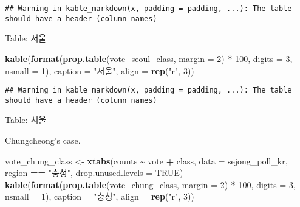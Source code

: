 \documentclass[
]{article}
\newenvironment{Shaded}{\begin{snugshade}}{\end{snugshade}}
\newcommand{\DataTypeTok}[1]{\textcolor[rgb]{0.13,0.29,0.53}{#1}}
\newcommand{\DecValTok}[1]{\textcolor[rgb]{0.00,0.00,0.81}{#1}}
\newcommand{\KeywordTok}[1]{\textcolor[rgb]{0.13,0.29,0.53}{\textbf{#1}}}
\newcommand{\NormalTok}[1]{#1}
\newcommand{\OperatorTok}[1]{\textcolor[rgb]{0.81,0.36,0.00}{\textbf{#1}}}
\newcommand{\OtherTok}[1]{\textcolor[rgb]{0.56,0.35,0.01}{#1}}
\newcommand{\StringTok}[1]{\textcolor[rgb]{0.31,0.60,0.02}{#1}}
\begin{document}
\begin{verbatim}
## Warning in kable_markdown(x, padding = padding, ...): The table should have a header (column names)
\end{verbatim}

Table: 서울

\textbar\textbar{} \textbar\textbar{} \textbar\textbar{}
\textbar\textbar{}

\begin{Shaded}
\begin{Highlighting}[]
\KeywordTok{kable}\NormalTok{(}\KeywordTok{format}\NormalTok{(}\KeywordTok{prop.table}\NormalTok{(vote\_seoul\_class, }\DataTypeTok{margin =} \DecValTok{2}\NormalTok{) }\OperatorTok{*}\StringTok{ }\DecValTok{100}\NormalTok{, }
             \DataTypeTok{digits  =} \DecValTok{3}\NormalTok{, }\DataTypeTok{nsmall =} \DecValTok{1}\NormalTok{), }
      \DataTypeTok{caption =} \StringTok{"서울"}\NormalTok{, }
      \DataTypeTok{align =} \KeywordTok{rep}\NormalTok{(}\StringTok{"r"}\NormalTok{, }\DecValTok{3}\NormalTok{))}
\end{Highlighting}
\end{Shaded}

\begin{verbatim}
## Warning in kable_markdown(x, padding = padding, ...): The table should have a header (column names)
\end{verbatim}

Table: 서울

\textbar\textbar{} \textbar\textbar{} \textbar\textbar{}
\textbar\textbar{}

Chungcheong's case.

\begin{Shaded}
\begin{Highlighting}[]
\NormalTok{vote\_chung\_class \textless{}{-}}\StringTok{ }\KeywordTok{xtabs}\NormalTok{(counts }\OperatorTok{\textasciitilde{}}\StringTok{ }\NormalTok{vote }\OperatorTok{+}\StringTok{ }\NormalTok{class, }
                          \DataTypeTok{data =}\NormalTok{ sejong\_poll\_kr, }
\NormalTok{                          region }\OperatorTok{==}\StringTok{ "충청"}\NormalTok{, }
                          \DataTypeTok{drop.unused.levels =} \OtherTok{TRUE}\NormalTok{)}
\KeywordTok{kable}\NormalTok{(}\KeywordTok{format}\NormalTok{(}\KeywordTok{prop.table}\NormalTok{(vote\_chung\_class, }\DataTypeTok{margin =} \DecValTok{2}\NormalTok{) }\OperatorTok{*}\StringTok{ }\DecValTok{100}\NormalTok{, }
             \DataTypeTok{digits =} \DecValTok{3}\NormalTok{, }\DataTypeTok{nsmall =} \DecValTok{1}\NormalTok{), }
      \DataTypeTok{caption =} \StringTok{"충청"}\NormalTok{, }
      \DataTypeTok{align =} \KeywordTok{rep}\NormalTok{(}\StringTok{"r"}\NormalTok{, }\DecValTok{3}\NormalTok{))}
\end{Highlighting}
\end{Shaded}
\end{document}
